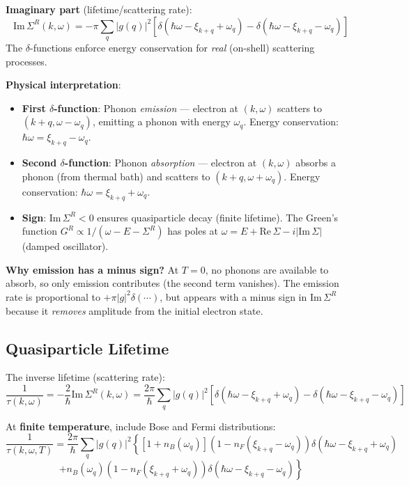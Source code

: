 \documentclass[12pt]{article}
\begin{document}
\textbf{Imaginary part} (lifetime/scattering rate):
\begin{equation}
\boxed{
\text{Im}\,\Sigma^R(k,\omega) = -\pi \sum_q |g(q)|^2 \left[\delta(\hbar\omega - \xi_{k+q} + \omega_q) - \delta(\hbar\omega - \xi_{k+q} - \omega_q)\right]
}
\end{equation}
The $\delta$-functions enforce energy conservation for \textit{real} (on-shell) scattering processes.

\textbf{Physical interpretation}:
\begin{itemize}
\item \textbf{First $\delta$-function}: Phonon \textit{emission} — electron at $(k,\omega)$ scatters to $(k+q, \omega-\omega_q)$, emitting a phonon with energy $\omega_q$. Energy conservation: $\hbar\omega = \xi_{k+q} - \omega_q$.
\item \textbf{Second $\delta$-function}: Phonon \textit{absorption} — electron at $(k,\omega)$ absorbs a phonon (from thermal bath) and scatters to $(k+q, \omega+\omega_q)$. Energy conservation: $\hbar\omega = \xi_{k+q} + \omega_q$.
\item \textbf{Sign}: $\text{Im}\,\Sigma^R < 0$ ensures quasiparticle decay (finite lifetime). The Green's function $G^R \propto 1/(\omega - E - \Sigma^R)$ has poles at $\omega = E + \text{Re}\,\Sigma - i|\text{Im}\,\Sigma|$ (damped oscillator).
\end{itemize}

\textbf{Why emission has a minus sign?} At $T=0$, no phonons are available to absorb, so only emission contributes (the second term vanishes). The emission rate is proportional to $+\pi|g|^2\delta(\cdots)$, but appears with a minus sign in $\text{Im}\,\Sigma^R$ because it \textit{removes} amplitude from the initial electron state.

\subsection{Quasiparticle Lifetime}

The inverse lifetime (scattering rate):
\begin{equation}
\boxed{
\frac{1}{\tau(k,\omega)} = -\frac{2}{\hbar}\text{Im}\,\Sigma^R(k,\omega) = \frac{2\pi}{\hbar} \sum_q |g(q)|^2 \left[\delta(\hbar\omega - \xi_{k+q} + \omega_q) - \delta(\hbar\omega - \xi_{k+q} - \omega_q)\right]
}
\end{equation}

At \textbf{finite temperature}, include Bose and Fermi distributions:
\begin{equation}
\boxed{
\frac{1}{\tau(k,\omega,T)} = \frac{2\pi}{\hbar} \sum_q |g(q)|^2 \left\{
[1 + n_B(\omega_q)](1 - n_F(\xi_{k+q} - \omega_q)) \delta(\hbar\omega - \xi_{k+q} + \omega_q)
\right.
}
\end{equation}
\begin{equation}
\boxed{
\left.
+ n_B(\omega_q)(1 - n_F(\xi_{k+q} + \omega_q)) \delta(\hbar\omega - \xi_{k+q} - \omega_q)
\right\}
}
\end{equation}
\end{document}
